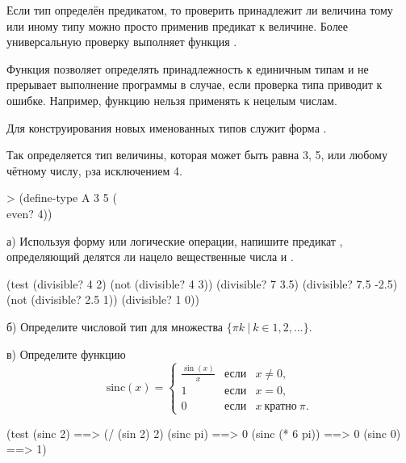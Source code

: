 Если тип определён предикатом, то проверить принадлежит ли величина тому или иному типу можно просто применив предикат к величине. Более универсальную проверку выполняет функция .

\begin{example}{%
Функция  позволяет определять принадлежность к единичным типам и не прерывает выполнение программы в случае, если проверка типа приводит к ошибке. Например, функцию  нельзя применять к нецелым числам.}
\end{example}

Для конструирования новых именованных типов служит форма .

\begin{example}{%
Так определяется тип величины, которая может быть равна 3, 5, или любому чётному числу, pза исключением 4.}
\begin{ExampleCode}
> (define-type A
    3 5 (\\ even? 4))
\end{ExampleCode}
\end{example}


\begin{Assignment}
а) Используя форму  или логические операции, напишите предикат , определяющий делятся ли нацело вещественные числа  и . 

\begin{Specification}
(test
  (divisible? 4 2)
  (not (divisible? 4 3))
  (divisible? 7 3.5)
  (divisible? 7.5 -2.5)
  (not (divisible? 2.5 1))
  (divisible? 1 0))
\end{Specification}

б) Определите числовой тип для множества $\{\pi k\ |\ k \in 1,2, ...\}$.

в) Определите функцию 
\begin{equation*}
\mathrm{sinc}(x) = \left\{
\begin{array}{lll}
  \frac{\sin(x)}{x} &\text{если}& x \neq 0,\\
  1 &\text{если}& x = 0,\\
  0 &\text{если}& x~\text{кратно}~\pi.
\end{array}\right. 
\end{equation*}
 
\begin{Specification}
(test
  (sinc 2)        ==> (/ (sin 2) 2)
  (sinc pi)       ==> 0
  (sinc (* 6 pi)) ==> 0
  (sinc 0)        ==> 1)
\end{Specification}
\end{Assignment}



